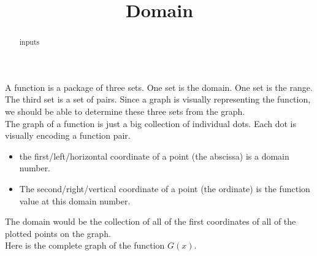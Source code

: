 \documentclass{ximera}
\title{Domain}
\begin{document}
\begin{abstract}
inputs
\end{abstract}
\maketitle


A function is a package of three sets.  One set is the domain. One set is the range. The third set is a set of pairs. Since a graph is visually representing the function, we should be able to determine these three sets from the graph.\\


The graph of a function is just a big collection of individual dots. Each dot is visually encoding a function pair. \\



\begin{itemize}
     \item the first/left/horizontal coordinate of a point (the abscissa) is a domain number.
     \item The second/right/vertical coordinate of a point (the ordinate) is the function value at this domain number.
\end{itemize}



The domain would be the collection of all of the first coordinates of all of the plotted points on the graph. \\






Here is the complete graph of the function $G(x)$. \\
\end{document}
